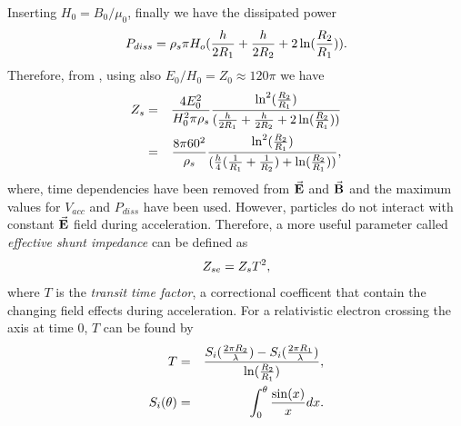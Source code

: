 \documentclass{article}
\begin{document}
Inserting $H_0=B_0/\mu_0$, finally we have the dissipated power
\vspace{-10pt}\begin{equation} \label{eq:p_diss}
    P_{diss} = \rho_s \pi H_o ( \frac{h}{2R_1} + \frac{h}{2R_2} + 2\ln(\frac{R_2}{R_1}) ).
\vspace{-10pt}\end{equation}
Therefore, from , using  also $E_0/H_0 = Z_0 \approx 120 \pi$ we have
\vspace{-10pt}\begin{eqnarray}
    Z_s &=& \frac{4E_0^2}{H_0^2 \pi \rho_s} \frac{ \ln^2(\frac{R_2}{R_1})}{(\frac{h}{2R_1} + \frac{h}{2R_2} + 2 \ln(\frac{R_2}{R_1}))} \nonumber\\
        &=& \frac{8 \pi 60^2}{\rho_s} \frac{ \ln^2(\frac{R_2}{R_1})}{(\frac{h}{4}(\frac{1}{R_1} + \frac{1}{R_2}) + \ln(\frac{R_2}{R_1}))}   ,
\vspace{-10pt}\end{eqnarray}
where, time dependencies have been removed from $\vec{\textbf{E}}$ and $\vec{\textbf{B}}$ 
and the maximum values for $V_{acc}$ and $P_{diss}$ have been used. 
However, particles do not interact with constant $\vec{\textbf{E}}$ field during acceleration. 
Therefore, a more useful parameter called \textit{effective shunt impedance} can be defined as
\vspace{-10pt}\begin{equation}
    Z_{se} = Z_s T^2  ,
\vspace{-10pt}\end{equation}
where $T$ is the \textit{transit time factor}, a correctional coefficent that contain the changing field effects during acceleration.
\clearpage
For a relativistic electron crossing the axis at time 0, $T$ can be found by \cite{rhodo_pottier}
\vspace{-10pt}\begin{eqnarray}
    T &=& \frac{S_i(\frac{2 \pi R_2}{\lambda}) - S_i(\frac{2 \pi R_1}{\lambda})}{\ln(\frac{R_2}{R_1})}   ,\\
    S_i(\theta) &=& \int_0^{\theta} \frac{\sin(x)}{x} dx .
\vspace{-10pt}\end{eqnarray}
\end{document}
